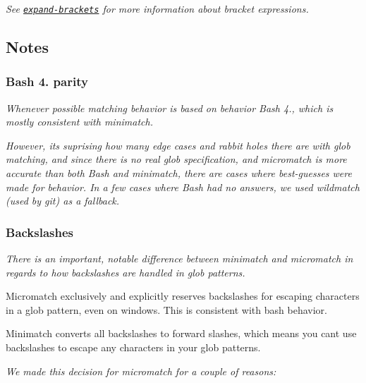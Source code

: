 {\itshape See \href{https://github.com/jonschlinkert/expand-brackets}{\tt expand-\/brackets} for more information about bracket expressions.}

{\itshape 

}

{\itshape \subsection*{Notes}}

{\itshape }

{\itshape \subsubsection*{Bash 4. parity}}

{\itshape }

{\itshape Whenever possible matching behavior is based on behavior Bash 4., which is mostly consistent with minimatch.}

{\itshape However, it\textquotesingle{}s suprising how many edge cases and rabbit holes there are with glob matching, and since there is no real glob specification, and micromatch is more accurate than both Bash and minimatch, there are cases where best-\/guesses were made for behavior. In a few cases where Bash had no answers, we used wildmatch (used by git) as a fallback.}

{\itshape \subsubsection*{Backslashes}}

{\itshape }

{\itshape There is an important, notable difference between minimatch and micromatch {\itshape in regards to how backslashes are handled} in glob patterns.}

{\itshape 
\begin{DoxyItemize}
\item Micromatch exclusively and explicitly reserves backslashes for escaping characters in a glob pattern, even on windows. This is consistent with bash behavior.
\item Minimatch converts all backslashes to forward slashes, which means you can\textquotesingle{}t use backslashes to escape any characters in your glob patterns.
\end{DoxyItemize}}

{\itshape We made this decision for micromatch for a couple of reasons\+:}

